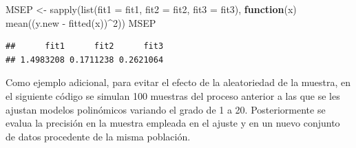 \documentclass[
]{book}
\newenvironment{Shaded}{\begin{snugshade}}{\end{snugshade}}
\newcommand{\AttributeTok}[1]{\textcolor[rgb]{0.77,0.63,0.00}{#1}}
\newcommand{\ControlFlowTok}[1]{\textcolor[rgb]{0.13,0.29,0.53}{\textbf{#1}}}
\newcommand{\DecValTok}[1]{\textcolor[rgb]{0.00,0.00,0.81}{#1}}
\newcommand{\FunctionTok}[1]{\textcolor[rgb]{0.00,0.00,0.00}{#1}}
\newcommand{\NormalTok}[1]{#1}
\newcommand{\OtherTok}[1]{\textcolor[rgb]{0.56,0.35,0.01}{#1}}
\newcommand{\SpecialCharTok}[1]{\textcolor[rgb]{0.00,0.00,0.00}{#1}}
\theoremstyle{break}
\theoremstyle{definition}
\theoremstyle{definition}
\theoremstyle{definition}
\theoremstyle{definition}
\theoremstyle{remark}
\begin{document}
\begin{Shaded}
\begin{Highlighting}[]
\NormalTok{MSEP }\OtherTok{\textless{}{-}} \FunctionTok{sapply}\NormalTok{(}\FunctionTok{list}\NormalTok{(}\AttributeTok{fit1 =}\NormalTok{ fit1, }\AttributeTok{fit2 =}\NormalTok{ fit2, }\AttributeTok{fit3 =}\NormalTok{ fit3), }
               \ControlFlowTok{function}\NormalTok{(x) }\FunctionTok{mean}\NormalTok{((y.new }\SpecialCharTok{{-}} \FunctionTok{fitted}\NormalTok{(x))}\SpecialCharTok{\^{}}\DecValTok{2}\NormalTok{))}
\NormalTok{MSEP}
\end{Highlighting}
\end{Shaded}

\begin{verbatim}
##      fit1      fit2      fit3 
## 1.4983208 0.1711238 0.2621064
\end{verbatim}

Como ejemplo adicional, para evitar el efecto de la aleatoriedad de la muestra, en el siguiente código se simulan 100 muestras del proceso anterior a las que se les ajustan modelos polinómicos variando el grado de 1 a 20. Posteriormente se evalua la precisión en la muestra empleada en el ajuste y en un nuevo conjunto de datos procedente de la misma población.
\end{document}
